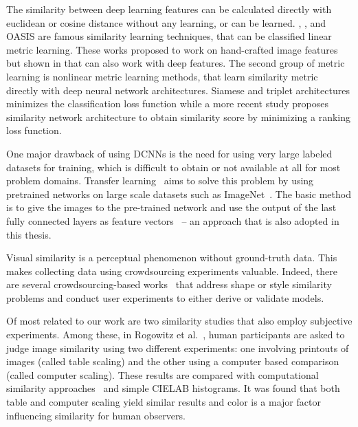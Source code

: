 The similarity between deep learning features can be calculated directly with euclidean or cosine distance without any learning, or can be learned. \cite{frome2007image}, \cite{mcfee2010metric}, \cite{liang2016optimizing} and  OASIS\cite{chechik2010large} are famous similarity learning techniques, that can be classified linear metric learning. These works proposed to work on hand-crafted image features but shown in \cite{wan2014deep} that can also work with deep features. The second group of metric learning is nonlinear metric learning methods, that learn similarity metric directly with deep neural network architectures\cite{pinheiro2018unsupervised}. Siamese\cite{chopra2005learning}\cite{bell2015learning} and triplet\cite{wang2014learning} \cite{arandjelovic2016netvlad} architectures minimizes the classification loss function while a more recent study \cite{garcia2019learning} proposes similarity network architecture to obtain similarity score by minimizing a ranking loss function.

One major drawback of using DCNNs is the need for using very large labeled datasets for training, which is difficult to obtain or not available at all for most problem domains. Transfer learning~\cite{yosinski2014transferable} aims to solve this problem by using pretrained networks on large scale datasets such as ImageNet~\cite{russakovsky2015imagenet}. The basic method is to give the images to the pre-trained network and use the output of the last fully connected layers as feature vectors~\cite{donahue2014decaf,wan2014deep} -- an approach that is also adopted in this thesis.

Visual similarity is a perceptual phenomenon without ground-truth data. This makes collecting data using crowdsourcing experiments valuable. Indeed, there are several crowdsourcing-based works~\cite{lun2015elements,saleh2015learning,kleiman2016toward} that address shape or style similarity problems and conduct user experiments to either derive or validate models. 

Of most related to our work are two similarity studies that also employ subjective experiments. Among these, in Rogowitz et al.~\cite{rogowitz1998perceptual}, human participants are asked to judge image similarity using two different experiments: one involving printouts of images (called table scaling) and the other using a computer based comparison (called computer scaling). These results are compared with computational similarity approaches~\cite{frese1997methodology} and simple CIELAB histograms. It was found that both table and computer scaling yield similar results and color is a major factor influencing similarity for human observers.

